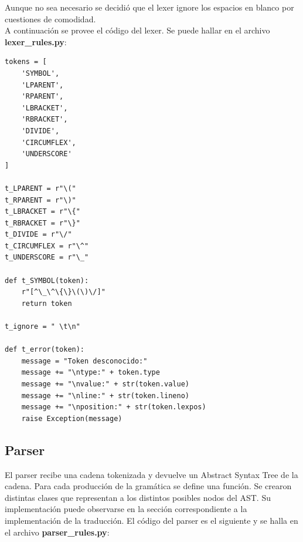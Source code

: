 \indent Aunque no sea necesario se decidió que el lexer ignore los espacios en blanco por cuestiones de comodidad.\\

\indent A continuación se provee el código del lexer. Se puede hallar en el archivo \textbf{lexer\_rules.py}:\\

\begin{verbatim}
tokens = [
    'SYMBOL',
    'LPARENT',
    'RPARENT',
    'LBRACKET',
    'RBRACKET',
    'DIVIDE',
    'CIRCUMFLEX',
    'UNDERSCORE'
]

t_LPARENT = r"\("
t_RPARENT = r"\)"
t_LBRACKET = r"\{"
t_RBRACKET = r"\}"
t_DIVIDE = r"\/"
t_CIRCUMFLEX = r"\^"
t_UNDERSCORE = r"\_"

def t_SYMBOL(token):
    r"[^\_\^\{\}\(\)\/]"
    return token

t_ignore = " \t\n"

def t_error(token):
    message = "Token desconocido:"
    message += "\ntype:" + token.type
    message += "\nvalue:" + str(token.value)
    message += "\nline:" + str(token.lineno)
    message += "\nposition:" + str(token.lexpos)
    raise Exception(message)

\end{verbatim}

\subsection{Parser}

\indent \indent El parser recibe una cadena tokenizada y devuelve un Abstract Syntax Tree de la cadena. Para cada producción de la gramática se define una función. Se crearon distintas clases que representan a los distintos posibles nodos del AST. Su implementación puede observarse en la sección correspondiente a la implementación de la traducción. El código del parser es el siguiente y se halla en el archivo \textbf{parser\_rules.py}:\\

